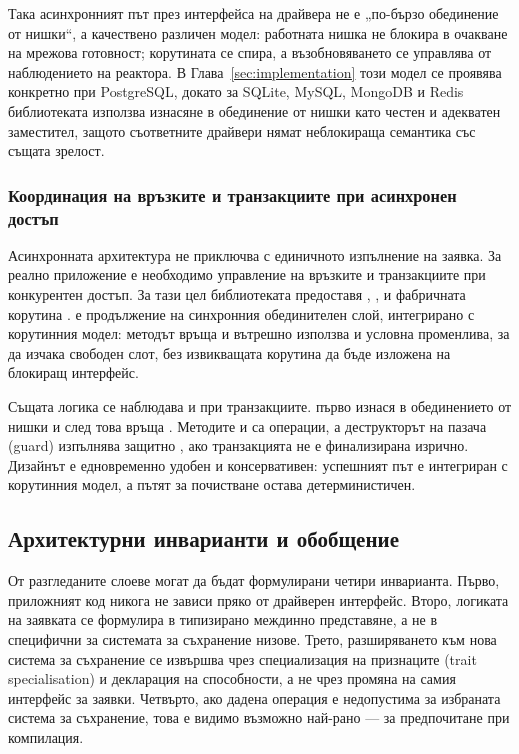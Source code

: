 Така асинхронният път през интерфейса на драйвера не е „по-бързо обединение от нишки“, а качествено различен модел: работната нишка не блокира в очакване на мрежова готовност; корутината се спира, а възобновяването се управлява от наблюдението на реактора. В Глава~\ref{sec:implementation} този модел се проявява конкретно при PostgreSQL, докато за SQLite, MySQL, MongoDB и Redis библиотеката използва изнасяне в обединение от нишки като честен и адекватен заместител, защото съответните драйвери нямат неблокираща семантика със същата зрелост.

\subsubsection{Координация на връзките и транзакциите при асинхронен достъп}

Асинхронната архитектура не приключва с единичното изпълнение на заявка. За реално приложение е необходимо управление на връзките и транзакциите при конкурентен достъп. За тази цел библиотеката предоставя , ,  и фабричната корутина .  е продължение на синхронния обединителен слой, интегрирано с корутинния модел: методът  връща  и вътрешно използва  и условна променлива, за да изчака свободен слот, без извикващата корутина да бъде изложена на блокиращ интерфейс.

Същата логика се наблюдава и при транзакциите.  първо изнася  в обединението от нишки и след това връща . Методите  и  са  операции, а деструкторът на пазача (guard) изпълнява защитно , ако транзакцията не е финализирана изрично. Дизайнът е едновременно удобен и консервативен: успешният път е интегриран с корутинния модел, а пътят за почистване остава детерминистичен.

\subsection{Архитектурни инварианти и обобщение}

От разгледаните слоеве могат да бъдат формулирани четири инварианта. Първо, приложният код никога не зависи пряко от драйверен интерфейс. Второ, логиката на заявката се формулира в типизирано междинно представяне, а не в специфични за системата за съхранение низове. Трето, разширяването към нова система за съхранение се извършва чрез специализация на признаците (trait specialisation) и декларация на способности, а не чрез промяна на самия интерфейс за заявки. Четвърто, ако дадена операция е недопустима за избраната система за съхранение, това е видимо възможно най-рано --- за предпочитане при компилация.

